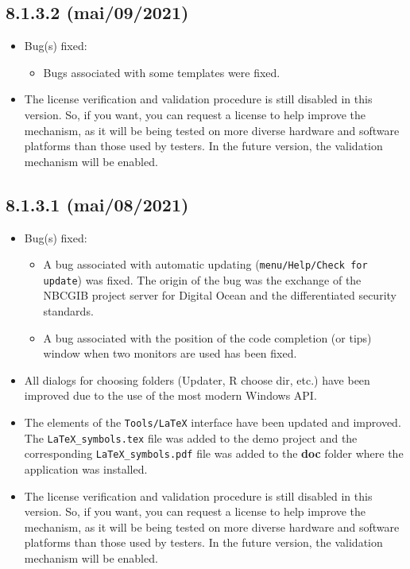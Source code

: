 \subsection*{8.1.3.2 (mai/09/2021)}
\begin{itemize}
  \item Bug(s) fixed:
    \begin{itemize}
      \item Bugs associated with some templates were fixed.
    \end{itemize}
  \item The license verification and validation procedure is still disabled in this version.
    So, if you want, you can request a license to help improve the mechanism,
    as it will be being tested on more diverse hardware and software platforms than
    those used by testers. In the future version, the validation mechanism will be enabled.
\end{itemize}

\subsection*{8.1.3.1 (mai/08/2021)}
\begin{itemize}
  \item Bug(s) fixed:
    \begin{itemize}
      \item A bug associated with automatic updating (\texttt{menu/Help/Check for update}) was fixed. 
        The origin of the bug was the exchange of the NBCGIB project server for Digital Ocean and the 
        differentiated security standards.
      \item A bug associated with the position of the code completion (or tips) window when two monitors
        are used has been fixed.
    \end{itemize}
  \item All dialogs for choosing folders (Updater, R choose dir, etc.) have been improved 
    due to the use of the most modern Windows API.
  \item The elements of the \texttt{Tools/LaTeX} interface have been updated and improved.
    The \texttt{LaTeX\_symbols.tex} file was added to the demo project and the corresponding
    \texttt{LaTeX\_symbols.pdf} file was added to the \textbf{doc} folder where the application
    was installed.
  \item The license verification and validation procedure is still disabled in this version.
    So, if you want, you can request a license to help improve the mechanism,
    as it will be being tested on more diverse hardware and software platforms than
    those used by testers. In the future version, the validation mechanism will be enabled.
\end{itemize}


